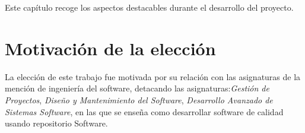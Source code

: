 


Este capítulo recoge los aspectos destacables durante el desarrollo del proyecto.
\section{Motivación de la elección}
La elección de este trabajo fue motivada por su relación con las asignaturas de la mención de ingeniería del software, detacando las asignaturas:\textit{Gestión de Proyectos}, \textit{Diseño y Mantenimiento del Software}, \textit{Desarrollo Avanzado de Sistemas Software}, en las que se enseña como desarrollar software de calidad usando repositorio Software.
